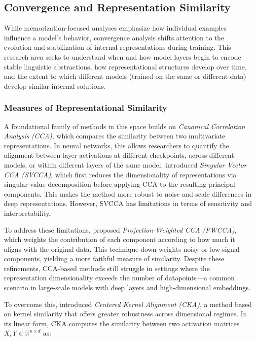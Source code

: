 \subsection{Convergence and Representation Similarity}

While memorization-focused analyses emphasize how individual examples influence a model's behavior, convergence analysis shifts attention to the evolution and stabilization of internal representations during training. This research area seeks to understand when and how model layers begin to encode stable linguistic abstractions, how representational structures develop over time, and the extent to which different models (trained on the same or different data) develop similar internal solutions.

\subsubsection{Measures of Representational Similarity}

A foundational family of methods in this space builds on \textit{Canonical Correlation Analysis (CCA)}, which compares the similarity between two multivariate representations. In neural networks, this allows researchers to quantify the alignment between layer activations at different checkpoints, across different models, or within different layers of the same model. \citet{raghu2017svcca} introduced \textit{Singular Vector CCA (SVCCA)}, which first reduces the dimensionality of representations via singular value decomposition before applying CCA to the resulting principal components. This makes the method more robust to noise and scale differences in deep representations. However, SVCCA has limitations in terms of sensitivity and interpretability.

To address these limitations, \citet{morcos2018pwcca} proposed \textit{Projection-Weighted CCA (PWCCA)}, which weights the contribution of each component according to how much it aligns with the original data. This technique down-weights noisy or low-signal components, yielding a more faithful measure of similarity. Despite these refinements, CCA-based methods still struggle in settings where the representation dimensionality exceeds the number of datapoints---a common scenario in large-scale models with deep layers and high-dimensional embeddings.

To overcome this, \citet{kornblith2019cka} introduced \textit{Centered Kernel Alignment (CKA)}, a method based on kernel similarity that offers greater robustness across dimensional regimes. In its linear form, CKA computes the similarity between two activation matrices \( X, Y \in \mathbb{R}^{n \times d} \) as:


